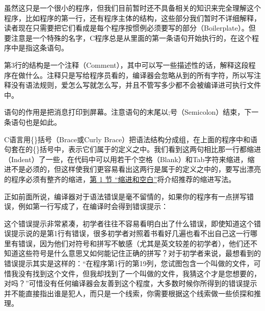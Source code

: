

虽然这只是一个很小的程序，但我们目前暂时还不具备相关的知识来完全理解这个程序，比如程序的第一行，还有程序主体的结构，这些部分我们暂时不详细解释，读者现在只需要把它们看成是每个程序按惯例必须要写的部分（Boilerplate）。但要注意是一个特殊的名字，C程序总是从里面的第一条语句开始执行的，在这个程序中是指这条语句。



第3行的结构是一个注释（Comment），其中可以写一些描述性的话，解释这段程序在做什么。注释只是写给程序员看的，编译器会忽略从\BookCode{/\BookSplit{}*}到\BookCode{*/\BookSplit{}}的所有字符，所以写注释没有语法规则，爱怎么写就怎么写，并且不管写多少都不会被编译进可执行文件中。



语句的作用是把消息打印到屏幕。注意语句的末尾以;号（Semicolon）结束，下一条语句也是如此。



C语言用\{\}括号（Brace或Curly Brace）把语法结构分成组，在上面的程序中和语句套在的\{\}括号中，表示它们属于的定义之中。我们看到这两句相比那一行都缩进（Indent）了一些，在代码中可以用若干个空格（Blank）和Tab字符来缩进，缩进不是必须的，但这样使我们更容易看出这两行是属于的定义之中的，要写出漂亮的程序必须有整齐的缩进，\hyperlink{db.ch09s01.id2737006}{第 1 节 “缩进和空白”}将介绍推荐的缩进写法。



正如前面所说，编译器对于语法错误是毫不留情的，如果你的程序有一点拼写错误，例如第一行写成了，在编译时会得到错误提示：




这个错误提示非常紧凑，初学者往往不容易看明白出了什么错误，即使知道这个错误提示说的是第1行有错误，很多初学者对照着书看好几遍也看不出自己这一行哪里有错误，因为他们对符号和拼写不敏感（尤其是英文较差的初学者），他们还不知道这些符号是什么意思又如何能记住正确的拼写？对于初学者来说，最想看到的错误提示其实是这样的：“在程序第1行的第19列，您试图包含一个叫做的文件，可惜我没有找到这个文件，但我却找到了一个叫做的文件，我猜这个才是您想要的，对吗？”可惜没有任何编译器会友善到这个程度，大多数时候你所得到的错误提示并不能直接指出谁是犯人，而只是一个线索，你需要根据这个线索做一些侦探和推理。



